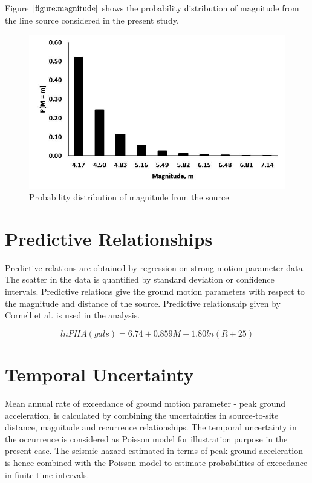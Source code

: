 \documentclass[a4paper,english,12pt]{article}
\begin{document}
Figure $\ref{figure:magnitude}$ shows the probability distribution of magnitude from the line source considered in the present study. 

\begin{figure}[h!]
\graphicspath{ {images/} }
\includegraphics[width=\textwidth]{P_m}
\caption{Probability distribution of magnitude from the source}
\label{figure:magnitude}
\centering
\end{figure}
\section{Predictive Relationships}
Predictive relations are obtained by regression on strong motion parameter data. The scatter in the data is quantified by standard deviation or confidence intervals. Predictive relations give the ground motion parameters with respect to the magnitude and distance of the source. Predictive relationship given by Cornell et al. is used in the analysis.

$$ln PHA (gals) = 6.74 + 0.859 M - 1.80 ln (R + 25)$$

\section{Temporal Uncertainty}
Mean annual rate of exceedance of ground motion parameter - peak ground acceleration, is calculated by combining the uncertainties in source-to-site distance, magnitude and recurrence relationships. The temporal uncertainty in the occurrence is considered as Poisson model for illustration purpose in the present case. The seismic hazard estimated in terms of peak ground acceleration is hence combined with the Poisson model to estimate probabilities of exceedance in finite time intervals.
\end{document}
